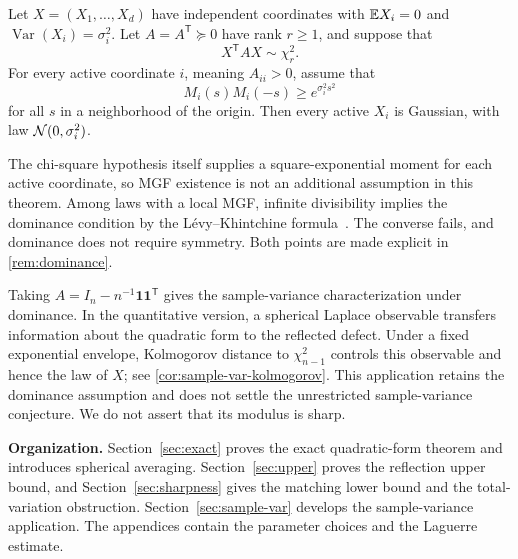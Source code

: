 \begin{theorem}\label{thm:exact-psd}
Let $X=(X_1,\ldots,X_d)$ have independent coordinates with $\mathbb E X_i=0$ and $\operatorname{Var}(X_i)=\sigma_i^2$. Let $A=A^{\mathsf T}\succeq0$ have rank $r\ge1$, and suppose that
\[
X^{\mathsf T}AX\sim\chi_r^2.
\]
For every active coordinate $i$, meaning $A_{ii}>0$, assume that
\[
M_i(s)M_i(-s)\ge e^{\sigma_i^2s^2}
\]
for all $s$ in a neighborhood of the origin. Then every active $X_i$ is Gaussian, with law $\mathcal N(0,\sigma_i^2)$.
\end{theorem}

The chi-square hypothesis itself supplies a square-exponential moment for each active coordinate, so MGF existence is not an additional assumption in this theorem. Among laws with a local MGF, infinite divisibility implies the dominance condition by the L\'evy--Khintchine formula~\cite{Sato1999}. The converse fails, and dominance does not require symmetry. Both points are made explicit in \cref{rem:dominance}.

Taking $A=I_n-n^{-1}\mathbf1\mathbf1^{\mathsf T}$ gives the sample-variance characterization under dominance. In the quantitative version, a spherical Laplace observable transfers information about the quadratic form to the reflected defect. Under a fixed exponential envelope, Kolmogorov distance to $\chi_{n-1}^2$ controls this observable and hence the law of $X$; see \cref{cor:sample-var-kolmogorov}. This application retains the dominance assumption and does not settle the unrestricted sample-variance conjecture. We do not assert that its modulus is sharp.

\noindent\textbf{Organization.}
Section~\ref{sec:exact} proves the exact quadratic-form theorem and introduces spherical averaging. Section~\ref{sec:upper} proves the reflection upper bound, and Section~\ref{sec:sharpness} gives the matching lower bound and the total-variation obstruction. Section~\ref{sec:sample-var} develops the sample-variance application. The appendices contain the parameter choices and the Laguerre estimate.
